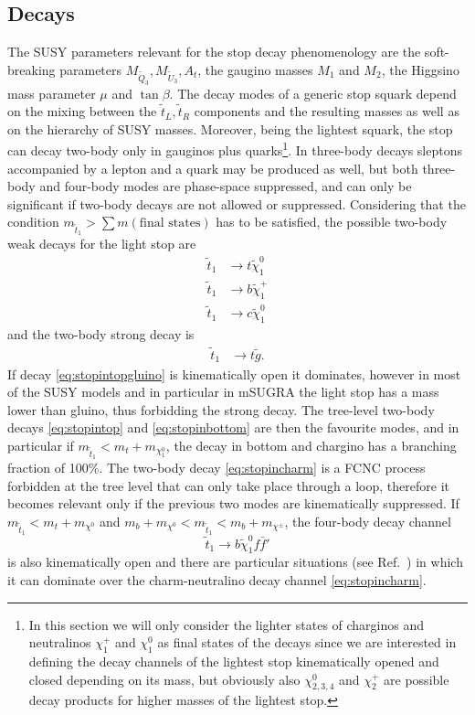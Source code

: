 \subsection{Decays}\label{sect:decays} 
The SUSY parameters relevant for the stop decay phenomenology are the soft-breaking parameters $M_{\tilde Q_3}, M_{\tilde U_3}, A_t$, the gaugino masses $M_1$ and $M_2$, the Higgsino mass parameter $\mu$ and $\tan\beta$. The decay modes of a generic stop squark depend on the mixing between the $\tilde{t}_{L},\tilde{t}_{R}$ components and the resulting masses as well as on the hierarchy of SUSY masses. Moreover, being the lightest squark, the stop can decay two-body only in gauginos plus quarks\footnote{In this section we will only consider the lighter states of charginos and neutralinos $\chi^+_{1}$ and $\chi^0_{1}$ as final states of the decays since we are interested in defining the decay channels of the lightest stop kinematically opened and closed depending on its mass, but obviously also $\chi^0_{2,3,4}$ and $\chi^+_{2}$ are possible decay products for higher masses of the lightest stop.}. In three-body decays sleptons accompanied by a lepton and a quark may be produced as well, but both three-body and four-body modes are phase-space suppressed, and can only be significant if two-body decays are not allowed or suppressed. Considering that the condition $m_{\tilde{t}_1}> \sum m(\mbox{final states})$ has to be satisfied, the possible two-body weak decays for the light stop are\begin{align}
\tilde{t}_1 &\rightarrow t \tilde \chi^0_{1} \label{eq:stopintop}\\
\tilde{t}_1 &\rightarrow b \tilde \chi^+_{1}\label{eq:stopinbottom}\\
\tilde{t}_1 &\rightarrow c \tilde \chi^0_{1} \label{eq:stopincharm}
\end{align} and the two-body strong decay is\begin{align}
\tilde{t}_1 &\rightarrow t \tilde g \label{eq:stopintopgluino} .
\end{align} If decay \ref{eq:stopintopgluino} is kinematically open it dominates, however in most of the SUSY models and in particular in mSUGRA the light stop has a mass lower than gluino, thus forbidding the strong decay. The tree-level two-body decays \ref{eq:stopintop} and \ref{eq:stopinbottom} are then the favourite modes, and in particular if $m_{\tilde{t}_1} < m_t + m_{\chi^0_1}$, the decay in bottom and chargino has a branching fraction of 100\%. The two-body decay \ref{eq:stopincharm} is a FCNC process forbidden at the tree level that can only take place through a loop, therefore it becomes relevant only if the previous two modes are kinematically suppressed. If $m_{\tilde{t}_1} < m_t + m_{\chi^0}$ and $m_b + m_{\chi^0} < m_{\tilde{t}_1} < m_b + m_{\chi^\pm}$, the four-body decay channel \begin{equation}\label{eq:stop4body}
\tilde{t}_1 \rightarrow b \tilde \chi^0_1 f \bar f'
\end{equation} is also kinematically open and there are particular situations (see Ref.~\cite{boehm-2000-61}) in which it can dominate over the charm-neutralino decay channel \ref{eq:stopincharm}.

